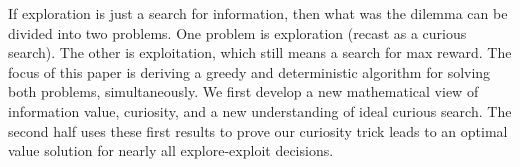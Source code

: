 If exploration is just a search for information, then what was the dilemma can be divided into two problems. One problem is exploration (recast as a curious search). The other is exploitation, which still means a search for max reward. The focus of this paper is deriving a greedy and deterministic algorithm for solving both problems, simultaneously. We first develop a new mathematical view of information value, curiosity, and a new understanding of ideal curious search. The second half uses these first results to prove our curiosity trick leads to an optimal value solution for nearly all explore-exploit decisions.



